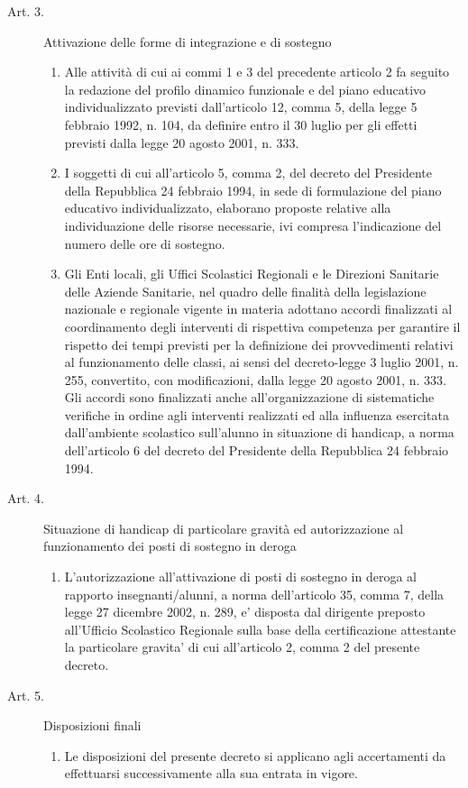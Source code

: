 \begin{description}
\begin{enumerate}
	\end{enumerate}
	\item [Art. 3.]Attivazione delle forme di integrazione e di sostegno
	\begin{enumerate}
		\item Alle attività di cui ai commi 1 e 3 del precedente articolo 2 fa seguito la redazione del profilo dinamico funzionale e del piano educativo individualizzato previsti dall'articolo 12, comma 5, della legge 5 febbraio 1992, n. 104, da definire entro il 30 luglio per gli effetti previsti dalla legge 20 agosto 2001, n. 333.
		\item I soggetti di cui all'articolo 5, comma 2, del decreto del Presidente della Repubblica 24 febbraio 1994, in sede di formulazione del piano educativo individualizzato, elaborano proposte relative alla individuazione delle risorse necessarie, ivi compresa l'indicazione del numero delle ore di sostegno.
		\item Gli Enti locali, gli Uffici Scolastici Regionali e le Direzioni Sanitarie delle Aziende Sanitarie, nel quadro delle finalità della legislazione nazionale e regionale vigente in materia adottano accordi finalizzati al coordinamento degli interventi di rispettiva competenza per garantire il rispetto dei tempi previsti per la definizione dei provvedimenti relativi al funzionamento delle classi, ai sensi del decreto-legge 3 luglio 2001, n. 255, convertito, con modificazioni, dalla legge 20 agosto 2001, n. 333. Gli accordi sono finalizzati anche all'organizzazione di sistematiche verifiche in ordine agli interventi realizzati ed alla influenza esercitata dall'ambiente scolastico sull'alunno in situazione di handicap, a norma dell'articolo 6 del decreto del Presidente della Repubblica 24 febbraio 1994.
	\end{enumerate}
	\item [Art. 4.] Situazione di handicap di particolare gravità ed autorizzazione al funzionamento dei posti di sostegno in deroga
	\begin{enumerate}
		\item L'autorizzazione all'attivazione di posti di sostegno in deroga al rapporto insegnanti/alunni, a norma dell'articolo 35, comma 7, della legge 27 dicembre 2002, n. 289, e' disposta dal dirigente preposto all'Ufficio Scolastico Regionale sulla base della certificazione attestante la particolare gravita' di cui all'articolo 2, comma 2 del presente decreto.
	\end{enumerate}
	\item [Art. 5.] Disposizioni finali 
	\begin{enumerate}
		\item Le disposizioni del presente decreto si applicano agli accertamenti da effettuarsi successivamente alla sua entrata in vigore.
	\end{enumerate}
\end{description}

